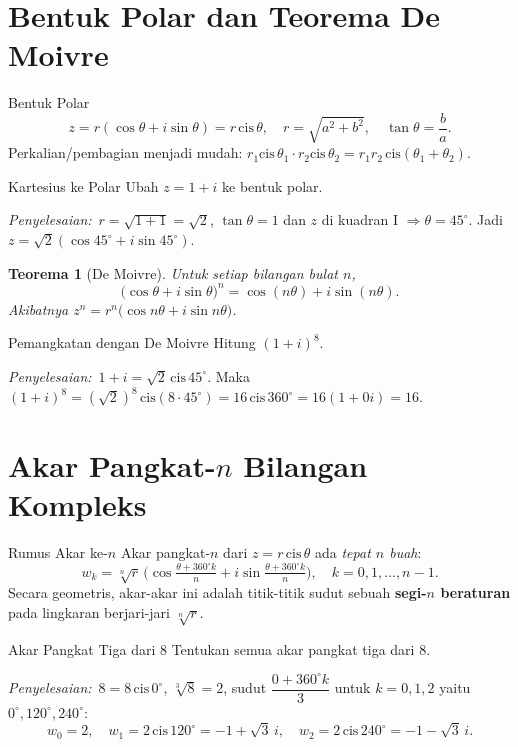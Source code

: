 \documentclass[11pt,a4paper]{report}
\theoremstyle{gaya}
\newtheorem{teorema}{Teorema}[chapter]
\newcommand{\jawab}{\par\smallskip\noindent\textit{\textcolor{oranye}{Penyelesaian:}}\ }
\begin{document}
\section{Bentuk Polar dan Teorema De Moivre}
\begin{konsep}{Bentuk Polar}
\[
z = r(\cos\theta + i\sin\theta)=r\,\mathrm{cis}\,\theta, \quad
r = \sqrt{a^2+b^2}, \quad \tan\theta = \frac{b}{a}.
\]
Perkalian/pembagian menjadi mudah: $r_1\mathrm{cis}\,\theta_1\cdot r_2\mathrm{cis}\,\theta_2=r_1r_2\,\mathrm{cis}(\theta_1+\theta_2)$.
\end{konsep}

\begin{contoh}{Kartesius ke Polar}
Ubah $z = 1 + i$ ke bentuk polar.

\jawab $r=\sqrt{1+1}=\sqrt2$, $\tan\theta = 1$ dan $z$ di kuadran I $\Rightarrow \theta = 45^\circ$.
Jadi $z = \sqrt2(\cos45^\circ + i\sin45^\circ).$
\end{contoh}

\begin{teorema}[De Moivre]
Untuk setiap bilangan bulat $n$,
\[
\big(\cos\theta+i\sin\theta\big)^n=\cos(n\theta)+i\sin(n\theta).
\]
Akibatnya $z^n=r^n\big(\cos n\theta+i\sin n\theta\big)$.
\end{teorema}

\begin{contoh}{Pemangkatan dengan De Moivre}
Hitung $(1+i)^8$.

\jawab $1+i=\sqrt2\,\mathrm{cis}\,45^\circ$. Maka $(1+i)^8=(\sqrt2)^8\,\mathrm{cis}(8\cdot45^\circ)=16\,\mathrm{cis}\,360^\circ=16(1+0i)=16.$
\end{contoh}

\section{Akar Pangkat-$n$ Bilangan Kompleks}
\begin{konsep}{Rumus Akar ke-$n$}
Akar pangkat-$n$ dari $z=r\,\mathrm{cis}\,\theta$ ada \emph{tepat $n$ buah}:
\[
w_k=\sqrt[n]{r}\,\Big(\cos\tfrac{\theta+360^\circ k}{n}+i\sin\tfrac{\theta+360^\circ k}{n}\Big),\quad k=0,1,\dots,n-1.
\]
Secara geometris, akar-akar ini adalah titik-titik sudut sebuah \textbf{segi-$n$ beraturan} pada lingkaran berjari-jari $\sqrt[n]{r}$.
\end{konsep}

\begin{contoh}{Akar Pangkat Tiga dari 8}
Tentukan semua akar pangkat tiga dari $8$.

\jawab $8=8\,\mathrm{cis}\,0^\circ$, $\sqrt[3]{8}=2$, sudut $\dfrac{0+360^\circ k}{3}$ untuk $k=0,1,2$ yaitu $0^\circ,120^\circ,240^\circ$:
\[
w_0=2,\quad w_1=2\,\mathrm{cis}\,120^\circ=-1+\sqrt3\,i,\quad w_2=2\,\mathrm{cis}\,240^\circ=-1-\sqrt3\,i.
\]
\end{contoh}
\end{document}

